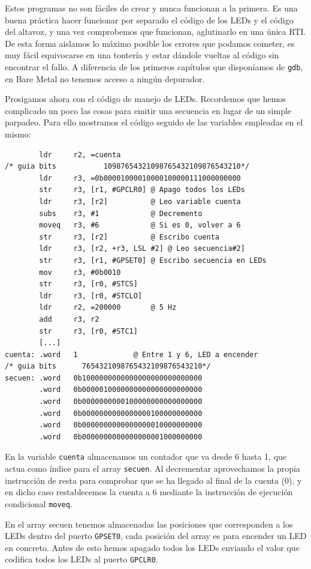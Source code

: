 Estos programas no son fáciles de crear y nunca funcionan a la primera. Es una buena práctica
hacer funcionar por separado el código de los LEDs y el código del altavoz, y una vez
comprobemos que funcionan, aglutinarlo en una única RTI. De esta forma aislamos lo máximo
posible los errores que podamos cometer, es muy fácil equivocarse en una tontería y estar
dándole vueltas al código sin encontrar el fallo. A diferencia de los primeros capítulos
que disponíamos de {\tt gdb}, en Bare Metal no tenemos acceso a ningún depurador.

Prosigamos ahora con el código de manejo de LEDs. Recordemos que hemos complicado un poco
las cosas para emitir una secuencia en lugar de un simple parpadeo. Para ello mostramos
el código seguido de las variables empleadas en el mismo:

\begin{lstlisting}
        ldr     r2, =cuenta
/* guia bits           10987654321098765432109876543210*/
        ldr     r3, =0b00001000010000100000111000000000
        str     r3, [r1, #GPCLR0] @ Apago todos los LEDs
        ldr     r3, [r2]          @ Leo variable cuenta
        subs    r3, #1            @ Decremento
        moveq   r3, #6            @ Si es 0, volver a 6
        str     r3, [r2]          @ Escribo cuenta
        ldr     r3, [r2, +r3, LSL #2] @ Leo secuencia#2]
        str     r3, [r1, #GPSET0] @ Escribo secuencia en LEDs
        mov     r3, #0b0010
        str     r3, [r0, #STCS]
        ldr     r3, [r0, #STCLO]
        ldr     r2, =200000       @ 5 Hz
        add     r3, r2
        str     r3, [r0, #STC1]
        [...]
cuenta: .word   1             @ Entre 1 y 6, LED a encender
/* guia bits      7654321098765432109876543210*/
secuen: .word   0b1000000000000000000000000000
        .word   0b0000010000000000000000000000
        .word   0b0000000000100000000000000000
        .word   0b0000000000000000100000000000
        .word   0b0000000000000000010000000000
        .word   0b0000000000000000001000000000
\end{lstlisting}

En la variable {\tt cuenta} almacenamos un contador que va desde 6 hasta 1, que actua
como índice para el array {\tt secuen}. Al decrementar aprovechamos la propia instrucción de
resta para comprobar que se ha llegado al final de la cuenta (0), y en dicho caso
restablecemos la cuenta a 6 mediante la instrucción de ejecución condicional {\tt moveq}.

En el array secuen tenemos almacenadas las posiciones que corresponden a los LEDs dentro del
puerto {\tt GPSET0}, cada posición del array es para encender un LED en concreto. Antes
de esto hemos apagado todos los LEDs enviando el valor que codifica todos los LEDs al
puerto {\tt GPCLR0}.

